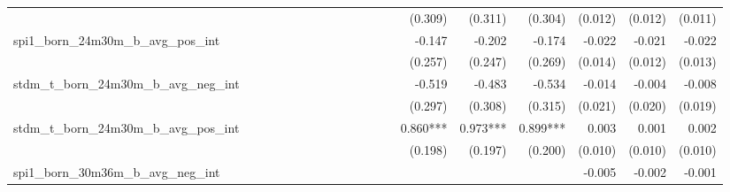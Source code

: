 \begin{tabular}{lrrrrrrrrrrrrrrrrrr}
                                            &              &              &              &              &              &              &              &              &               &              &              &               &      (0.309) &      (0.311) &       (0.304) &      (0.012) &      (0.012) &       (0.011) \\ 
spi1\_born\_24m30m\_b\_avg\_pos\_int        &              &              &              &              &              &              &              &              &               &              &              &               &       -0.147 &       -0.202 &        -0.174 &       -0.022 &       -0.021 &        -0.022 \\ 
                                            &              &              &              &              &              &              &              &              &               &              &              &               &      (0.257) &      (0.247) &       (0.269) &      (0.014) &      (0.012) &       (0.013) \\ 
stdm\_t\_born\_24m30m\_b\_avg\_neg\_int     &              &              &              &              &              &              &              &              &               &              &              &               &       -0.519 &       -0.483 &        -0.534 &       -0.014 &       -0.004 &        -0.008 \\ 
                                            &              &              &              &              &              &              &              &              &               &              &              &               &      (0.297) &      (0.308) &       (0.315) &      (0.021) &      (0.020) &       (0.019) \\ 
stdm\_t\_born\_24m30m\_b\_avg\_pos\_int     &              &              &              &              &              &              &              &              &               &              &              &               &     0.860*** &     0.973*** &      0.899*** &        0.003 &        0.001 &         0.002 \\ 
                                            &              &              &              &              &              &              &              &              &               &              &              &               &      (0.198) &      (0.197) &       (0.200) &      (0.010) &      (0.010) &       (0.010) \\ 
spi1\_born\_30m36m\_b\_avg\_neg\_int        &              &              &              &              &              &              &              &              &               &              &              &               &              &              &               &       -0.005 &       -0.002 &        -0.001 \\ 

\end{tabular}
